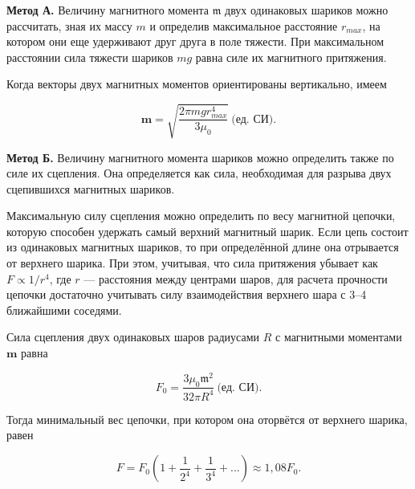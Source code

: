 \documentclass[a4paper, 12pt]{article}
\begin{document}
	\textbf{Метод А.} Величину магнитного момента $\mathfrak{m}$ двух одинаковых шариков можно рассчитать, зная их массу $m$ и определив максимальное расстояние $r_{max}$, на котором они еще удерживают друг друга в поле тяжести. При максимальном расстоянии сила тяжести шариков $mg$ равна силе их магнитного притяжения. 
	
	
	Когда векторы двух магнитных моментов ориентированы вертикально, имеем
	
	\begin{equation*}
		\mathbf{m} = \sqrt{\frac{2\pi mgr^4_{max}}{3 \mu_0}} \ \text{(ед. СИ).}
	\end{equation*}
	
	\textbf{Метод Б.} Величину магнитного момента шариков можно определить также по силе их сцепления. Она определяется как сила, необходимая для разрыва двух сцепившихся магнитных шариков. 
	
		
	
	Максимальную силу сцепления можно определить по весу магнитной цепочки, которую способен удержать самый верхний магнитный шарик. Если цепь состоит из одинаковых магнитных шариков, то при определённой длине она отрывается от верхнего шарика. При этом, учитывая, что сила притяжения убывает как $F \propto 1/r^4$, где $r$ — расстояния между центрами шаров, для расчета прочности цепочки достаточно учитывать силу взаимодействия верхнего шара с 3–4 ближайшими соседями.
	
	Сила сцепления двух одинаковых шаров радиусами $R$ с магнитными моментами $\mathbf{m}$ равна 
	
	\begin{equation*}
		F_0 = \frac{3 \mu_0 \mathfrak{m}^2}{32 \pi R^4}\  \text{(ед. СИ).}    
	\end{equation*}
	
	Тогда минимальный вес цепочки, при котором она оторвётся от верхнего шарика, равен
	
	\begin{equation*}
		F = F_0\left(1 + \frac{1}{2^4} + \frac{1}{3^4} + ... \right) \approx 1,08F_0.
	\end{equation*}
	
\end{document}
